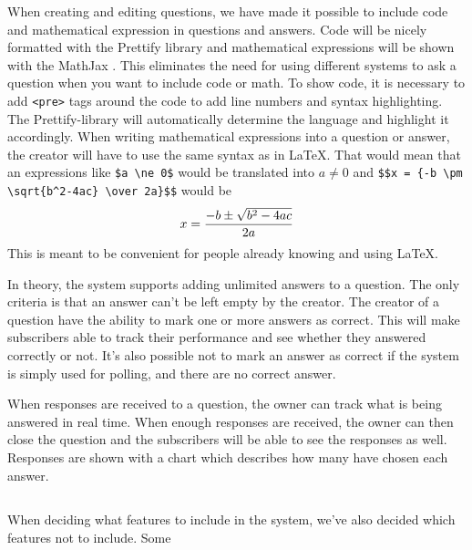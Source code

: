 When creating and editing questions, we have made it possible to include code and mathematical expression in questions and answers. Code will be nicely formatted with the Prettify library \cite{google/code-prettify_2016} and mathematical expressions will be shown with the MathJax \cite{mathjax_2016}. This eliminates the need for using different systems to ask a question when you want to include code or math. To show code, it is necessary to add \texttt{<pre>} tags around the code to add line numbers and syntax highlighting. The Prettify-library will automatically determine the language and highlight it accordingly. When writing mathematical expressions into a question or answer, the creator will have to use the same syntax as in \LaTeX. That would mean that an expressions like \verb|$a \ne 0$| would be translated into $a \ne 0$ and \verb|$$x = {-b \pm \sqrt{b^2-4ac} \over 2a}$$| would be $$x = {-b \pm \sqrt{b^2-4ac} \over 2a}$$
This is meant to be convenient for people already knowing and using \LaTeX.

In theory, the system supports adding unlimited answers to a question. The only criteria is that an answer can't be left empty by the creator. The creator of a question have the ability to mark one or more answers as correct. This will make subscribers able to track their performance and see whether they answered correctly or not. It's also possible not to mark an answer as correct if the system is simply used for polling, and there are no correct answer.

When responses are received to a question, the owner can track what is being answered in real time. When enough responses are received, the owner can then close the question and the subscribers will be able to see the responses as well. Responses are shown with a chart which describes how many have chosen each answer. 


\subsection{}
When deciding what features to include in the system, we've also decided which features not to include. Some 
